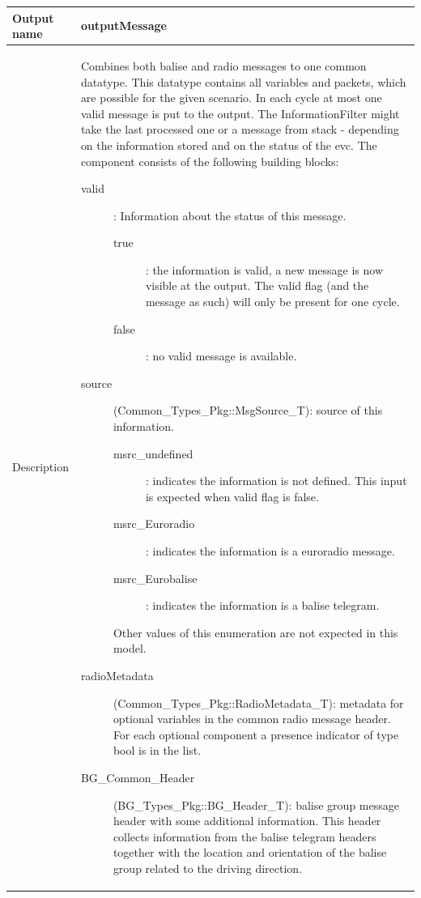 \begin{longtable}{p{}p{}}
\toprule
Output name				& outputMessage \\
\midrule
Description				& Combines both balise and radio messages to one common datatype. This datatype contains all variables and packets, which are possible for the given scenario. In each cycle at most one valid message is put to the output. The InformationFilter might take the last processed one or a message from stack - depending on the information stored and on the status of the evc. The component consists of the following building blocks:

\begin{description}
\item[valid]: Information about the status of this message.
\begin{description}
\item[true]: the information is valid, a new message is now visible at the output. The valid flag (and the message as such) will only be present for one cycle.
\item[false]: no valid message is available.
\end{description}
\item[source](Common\_Types\_Pkg::MsgSource\_T): source of this information. 
\begin{description}
\item[msrc\_undefined]: indicates the information is not defined. This input is expected when valid flag is false.
\item[msrc\_Euroradio]: indicates the information is a euroradio message.
\item[msrc\_Eurobalise]: indicates the information is a balise telegram.
\end{description}
Other values of this enumeration are not expected in this model.
\item[radioMetadata](Common\_Types\_Pkg::RadioMetadata\_T): metadata for optional variables in the common radio message header. For each optional component a presence indicator of type bool is in the list.  

\item[BG\_Common\_Header](BG\_Types\_Pkg::BG\_Header\_T): balise group message header with some additional information. This header collects information from the balise telegram headers together with the location and orientation of the balise group related to the driving direction.


\end{description}
\end{longtable}
